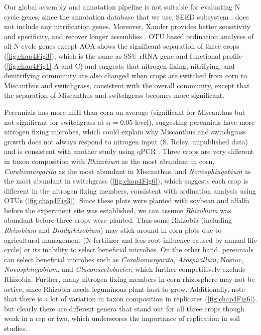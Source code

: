 \documentclass[]{msu-thesis}
\begin{document}
Our global assembly and annotation pipeline is not suitable for evaluating N cycle genes, since the annotation database that we use, SEED subsystem \cite{meyer_metagenomics_2008}, does not include any nitrification genes. Moreover, Xander provides better sensitivity and specificity, and recover longer assemblies \cite{wang_xander:_2015}. OTU based ordination analyses of all N cycle genes except AOA shows the significant separation of three crops (\cref{fig:chap4Fig3}), which is the same as SSU rRNA gene and functional profile (\cref{fig:chap4Fig1} A and C) and suggests that nitrogen fixing, nitrifying, and denitrifying community are also changed when crops are switched from corn to Miscanthus and switchgrass, consistent with the overall community, except that the separation of Miscanthus and switchgrass becomes more significant.

Perennials has more nifH than corn on average (significant for Miscanthus but not significant for switchgrass at $\alpha = 0.05$ level), suggesting perennials have more nitrogen fixing microbes, which could explain why Miscanthus and switchgrass growth does not always respond to nitrogen input \cite{schwarz_effect_1994,parrish_biology_2005} (S. Roley, unpublished data) and is consistent with another study using qPCR \cite{mao_impact_2013}. Three crops are very different in taxon composition with \textit{Rhizobium} as the most abundant in corn, \textit{Coraliomargarita} as the most abundant in Miscanthus, and \textit{Novosphingobium} as the most abundant in switchgrass (\cref{fig:chap4Fig6}), which suggests each crop is different in the nitrogen fixing members, consistent with ordination analysis using OTUs (\cref{fig:chap4Fig3}). Since these plots were planted with soybean and alfalfa before the experiment site was established, we can assume \textit{Rhizobium} was abundant before three crops were planted. Thus some Rhizobia (including \textit{Rhizobium} and \textit{Bradyrhizobium}) may stick around in corn plots due to agricultural management (N fertilizer and less root influence caused by annual life cycle) or its inability to select beneficial microbes. On the other hand, perennials can select beneficial microbes such as \textit{Coraliomargarita}, \textit{Azospirillum}, Nostoc, \textit{Novosphingobium}, and \textit{Gluconacetobacter}, which further competitively exclude Rhizobia. Further, many nitrogen fixing members in corn rhizosphere may not be active, since Rhizobia needs leguminous plant host to grow. Additionally, note that there is a lot of variation in taxon composition in replicates (\cref{fig:chap4Fig6}), but clearly there are different genera that stand out for all three crops though weak in a rep or two, which underscores the importance of replication in soil studies.
\end{document}
